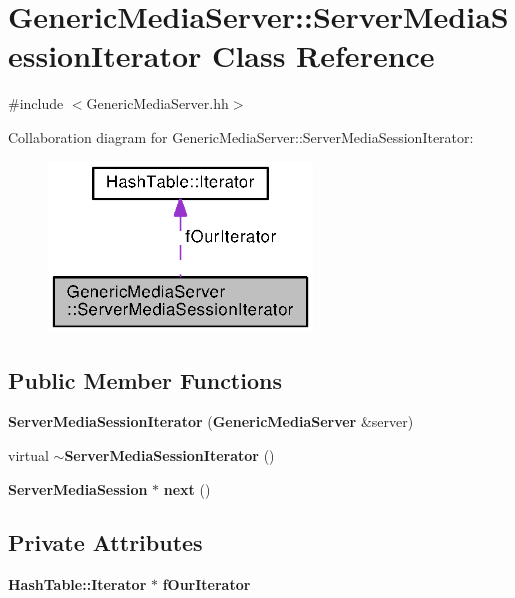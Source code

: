 \section{Generic\+Media\+Server\+:\+:Server\+Media\+Session\+Iterator Class Reference}
\label{classGenericMediaServer_1_1ServerMediaSessionIterator}


{\ttfamily \#include $<$Generic\+Media\+Server.\+hh$>$}



Collaboration diagram for Generic\+Media\+Server\+:\+:Server\+Media\+Session\+Iterator\+:
\nopagebreak
\begin{figure}[H]
\begin{center}
\leavevmode
\includegraphics[width=199pt]{classGenericMediaServer_1_1ServerMediaSessionIterator__coll__graph}
\end{center}
\end{figure}
\subsection*{Public Member Functions}
\begin{DoxyCompactItemize}
\item 
{\bf Server\+Media\+Session\+Iterator} ({\bf Generic\+Media\+Server} \&server)
\item 
virtual {\bf $\sim$\+Server\+Media\+Session\+Iterator} ()
\item 
{\bf Server\+Media\+Session} $\ast$ {\bf next} ()
\end{DoxyCompactItemize}
\subsection*{Private Attributes}
\begin{DoxyCompactItemize}
\item 
{\bf Hash\+Table\+::\+Iterator} $\ast$ {\bf f\+Our\+Iterator}
\end{DoxyCompactItemize}


